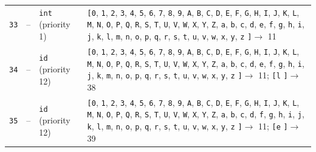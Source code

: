 \documentclass[11pt,a4paper]{article}
\newcommand{\opensymbolset}{\texttt{[}}
\newcommand{\closesymbolset}{\texttt{]}}
\begin{document}
\begin{landscape}
\begin{longtable}{
    >{\centering\arraybackslash}p{0.8cm}
    >{\centering\arraybackslash}p{0.7cm}
    >{\raggedright\arraybackslash}p{3.7cm}
    >{\raggedright\arraybackslash}p{18.1cm}
}
\texttt{33} & -- & \texttt{int} (priority 1) & \opensymbolset \texttt{0}, \texttt{1}, \texttt{2}, \texttt{3}, \texttt{4}, \texttt{5}, \texttt{6}, \texttt{7}, \texttt{8}, \texttt{9}, \texttt{A}, \texttt{B}, \texttt{C}, \texttt{D}, \texttt{E}, \texttt{F}, \texttt{G}, \texttt{H}, \texttt{I}, \texttt{J}, \texttt{K}, \texttt{L}, \texttt{M}, \texttt{N}, \texttt{O}, \texttt{P}, \texttt{Q}, \texttt{R}, \texttt{S}, \texttt{T}, \texttt{U}, \texttt{V}, \texttt{W}, \texttt{X}, \texttt{Y}, \texttt{Z}, \texttt{a}, \texttt{b}, \texttt{c}, \texttt{d}, \texttt{e}, \texttt{f}, \texttt{g}, \texttt{h}, \texttt{i}, \texttt{j}, \texttt{k}, \texttt{l}, \texttt{m}, \texttt{n}, \texttt{o}, \texttt{p}, \texttt{q}, \texttt{r}, \texttt{s}, \texttt{t}, \texttt{u}, \texttt{v}, \texttt{w}, \texttt{x}, \texttt{y}, \texttt{z} \closesymbolset $\to$ 11 \\
\texttt{34} & -- & \texttt{id} (priority 12) & \opensymbolset \texttt{0}, \texttt{1}, \texttt{2}, \texttt{3}, \texttt{4}, \texttt{5}, \texttt{6}, \texttt{7}, \texttt{8}, \texttt{9}, \texttt{A}, \texttt{B}, \texttt{C}, \texttt{D}, \texttt{E}, \texttt{F}, \texttt{G}, \texttt{H}, \texttt{I}, \texttt{J}, \texttt{K}, \texttt{L}, \texttt{M}, \texttt{N}, \texttt{O}, \texttt{P}, \texttt{Q}, \texttt{R}, \texttt{S}, \texttt{T}, \texttt{U}, \texttt{V}, \texttt{W}, \texttt{X}, \texttt{Y}, \texttt{Z}, \texttt{a}, \texttt{b}, \texttt{c}, \texttt{d}, \texttt{e}, \texttt{f}, \texttt{g}, \texttt{h}, \texttt{i}, \texttt{j}, \texttt{k}, \texttt{m}, \texttt{n}, \texttt{o}, \texttt{p}, \texttt{q}, \texttt{r}, \texttt{s}, \texttt{t}, \texttt{u}, \texttt{v}, \texttt{w}, \texttt{x}, \texttt{y}, \texttt{z} \closesymbolset $\to$ 11; \opensymbolset \texttt{l} \closesymbolset $\to$ 38 \\
\texttt{35} & -- & \texttt{id} (priority 12) & \opensymbolset \texttt{0}, \texttt{1}, \texttt{2}, \texttt{3}, \texttt{4}, \texttt{5}, \texttt{6}, \texttt{7}, \texttt{8}, \texttt{9}, \texttt{A}, \texttt{B}, \texttt{C}, \texttt{D}, \texttt{E}, \texttt{F}, \texttt{G}, \texttt{H}, \texttt{I}, \texttt{J}, \texttt{K}, \texttt{L}, \texttt{M}, \texttt{N}, \texttt{O}, \texttt{P}, \texttt{Q}, \texttt{R}, \texttt{S}, \texttt{T}, \texttt{U}, \texttt{V}, \texttt{W}, \texttt{X}, \texttt{Y}, \texttt{Z}, \texttt{a}, \texttt{b}, \texttt{c}, \texttt{d}, \texttt{f}, \texttt{g}, \texttt{h}, \texttt{i}, \texttt{j}, \texttt{k}, \texttt{l}, \texttt{m}, \texttt{n}, \texttt{o}, \texttt{p}, \texttt{q}, \texttt{r}, \texttt{s}, \texttt{t}, \texttt{u}, \texttt{v}, \texttt{w}, \texttt{x}, \texttt{y}, \texttt{z} \closesymbolset $\to$ 11; \opensymbolset \texttt{e} \closesymbolset $\to$ 39 \\

\end{longtable}
\end{landscape}
\end{document}
